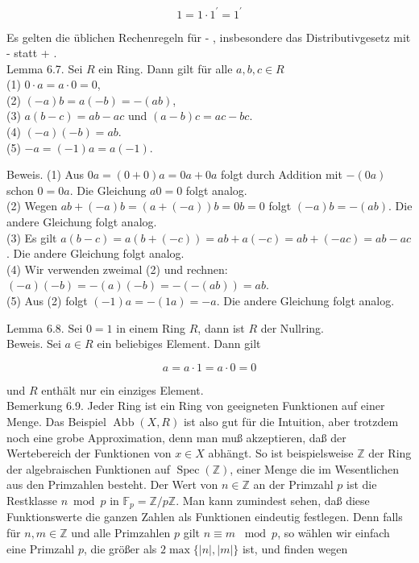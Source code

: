 \documentclass[10pt, letterpaper]{article}
\begin{document}
$$
1=1 \cdot 1^{\prime}=1^{\prime}
$$

Es gelten die üblichen Rechenregeln für - , insbesondere das Distributivgesetz mit - statt + .\\
Lemma 6.7. Sei $R$ ein Ring. Dann gilt für alle $a, b, c \in R$\\
(1) $0 \cdot a=a \cdot 0=0$,\\
(2) $(-a) b=a(-b)=-(a b)$,\\
(3) $a(b-c)=a b-a c$ und $(a-b) c=a c-b c$.\\
(4) $(-a)(-b)=a b$.\\
(5) $-a=(-1) a=a(-1)$.

Beweis. (1) Aus $0 a=(0+0) a=0 a+0 a$ folgt durch Addition mit $-(0 a)$ schon $0=0 a$. Die Gleichung $a 0=0$ folgt analog.\\
(2) Wegen $a b+(-a) b=(a+(-a)) b=0 b=0$ folgt $(-a) b=-(a b)$. Die andere Gleichung folgt analog.\\
(3) Es gilt $a(b-c)=a(b+(-c))=a b+a(-c)=a b+(-a c)=a b-a c$. Die andere Gleichung folgt analog.\\
(4) Wir verwenden zweimal (2) und rechnen: $(-a)(-b)=-(a)(-b)=-(-(a b))=a b$.\\
(5) Aus (2) folgt $(-1) a=-(1 a)=-a$. Die andere Gleichung folgt analog.

Lemma 6.8. Sei $0=1$ in einem Ring $R$, dann ist $R$ der Nullring.\\
Beweis. Sei $a \in R$ ein beliebiges Element. Dann gilt

$$
a=a \cdot 1=a \cdot 0=0
$$

und $R$ enthält nur ein einziges Element.\\
Bemerkung 6.9. Jeder Ring ist ein Ring von geeigneten Funktionen auf einer Menge. Das Beispiel $\operatorname{Abb}(X, R)$ ist also gut für die Intuition, aber trotzdem noch eine grobe Approximation, denn man muß akzeptieren, daß der Wertebereich der Funktionen von $x \in X$ abhängt. So ist beispielsweise $\mathbb{Z}$ der Ring der algebraischen Funktionen auf $\operatorname{Spec}(\mathbb{Z})$, einer Menge die im Wesentlichen aus den Primzahlen besteht. Der Wert von $n \in \mathbb{Z}$ an der Primzahl $p$ ist die Restklasse $n \bmod p$ in $\mathbb{F}_{p}=\mathbb{Z} / p \mathbb{Z}$. Man kann zumindest sehen, daß diese Funktionswerte die ganzen Zahlen als Funktionen eindeutig festlegen. Denn falls für $n, m \in \mathbb{Z}$ und alle Primzahlen $p$ gilt $n \equiv m$ $\bmod p$, so wählen wir einfach eine Primzahl $p$, die größer als $2 \max \{|n|,|m|\}$ ist, und finden wegen
\end{document}

